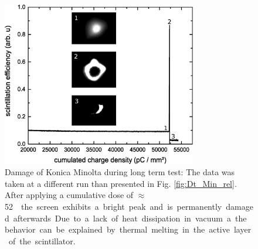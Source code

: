 \documentclass[%
preprint,
amsmath,
amssymb,
aip,
rsi, 
numerical,
floatfix,
]{revtex4-1}
\begin{document}
\begin{figure}
\includegraphics[width=8.5cm]{./Figures/Damage}%
\caption{\label{fig:Damage} Damage of Konica Minolta during long term test: 
The data was taken at a different run than presented in Fig. \ref{fig:Dt_Min_rel}. 
After applying a cumulative dose of $\approx$ \SI[per-mode=symbol]{52}{\nano\coulomb \per \milli\meter\square} the screen exhibits a bright peak and is permanently damaged afterwards. 
Due to a lack of heat dissipation in vacuum a the behavior can be explained by thermal melting in the active layer of the scintillator.}
\end{figure}
\end{document}
